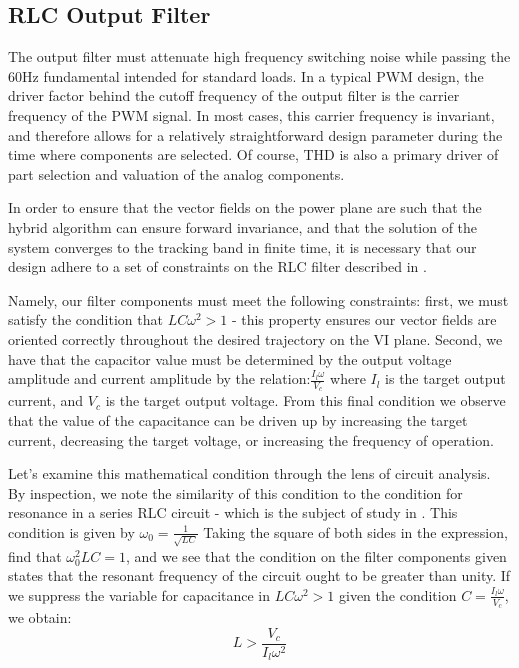 \subsection{RLC Output Filter}
The output filter must attenuate high frequency switching noise while passing the 60Hz fundamental intended for standard loads. In a typical PWM design, the driver factor behind the cutoff frequency of the output filter is the carrier frequency of the PWM signal. In most cases, this carrier frequency is invariant, and therefore allows for a relatively straightforward design parameter during the time where components are selected. Of course, THD is also a primary driver of part selection and valuation of the analog components.

In order to ensure that the vector fields on the power plane are such that the hybrid algorithm can ensure forward invariance, and that the solution of the system converges to the tracking band in finite time, it is necessary that our design adhere to a set of constraints on the RLC filter described in \cite{ricardo}. 

Namely, our filter components must meet the following constraints: first, we must satisfy the condition that $LC\omega^2>1$ - this property ensures our vector fields are oriented correctly throughout the desired trajectory on the VI plane. Second, we have that the capacitor value must be determined by the output voltage amplitude and current amplitude by the relation:$\frac{I_l\omega}{V_c}$ where $I_l$ is the target output current, and $V_c$ is the target output voltage. From this final condition we observe that the value of the capacitance can be driven up by increasing the target current, decreasing the target voltage, or increasing the frequency of operation. 

Let's examine this mathematical condition through the lens of circuit analysis. By inspection, we note the similarity of this condition to the condition for resonance in a series RLC circuit - which is the subject of study in \cite{ricardo}. This condition is given by $\omega_0 = \frac{1}{\sqrt{LC}}$ Taking the square of both sides in the expression, find that $\omega_0^2LC=1$, and we see that the condition on the filter components given states that the resonant frequency of the circuit ought to be greater than unity. If we suppress the variable for capacitance in 
$LC\omega^2>1$ given the condition $C=\frac{I_l\omega}{V_c}$, we obtain:
\begin{equation}
\label{constraint}
L > \frac{V_c}{I_l\omega^2}
\end{equation}

